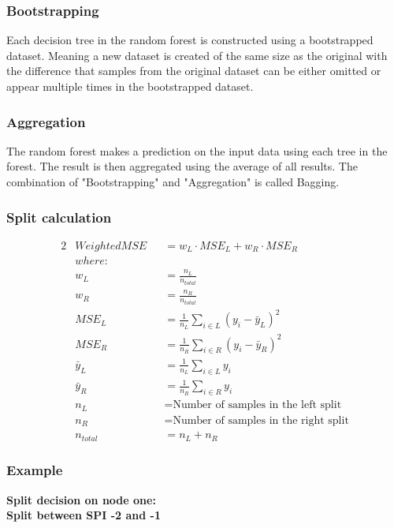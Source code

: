 \documentclass{article}
\begin{document}
\subsubsection{Bootstrapping}
Each decision tree in the random forest is constructed using a bootstrapped dataset. Meaning a new dataset is created of the same size as the original with the difference that samples from the original dataset can be either omitted or appear multiple times in the bootstrapped dataset.
\subsubsection{Aggregation}
The random forest makes a prediction on the input data using each tree in the forest. The result is then aggregated using the average of all results.
The combination of "Bootstrapping" and "Aggregation" is called Bagging.
\subsubsection{Split calculation}
\begin{alignat*}{2}
	 & Weighted MSE &  & = w_L \cdot MSE_L + w_R \cdot MSE_R                \\
	 & where:       &  &                                                    \\
	 & w_L          &  & = \frac{n_L}{n_{total}}                            \\
	 & w_R          &  & = \frac{n_R}{n_{total}}                            \\
	 & MSE_L        &  & = \frac{1}{n_L} \sum_{i \in L} (y_i - \bar{y}_L)^2 \\
	 & MSE_R        &  & = \frac{1}{n_R} \sum_{i \in R} (y_i - \bar{y}_R)^2 \\
	 & \bar{y}_L    &  & = \frac{1}{n_L} \sum_{i \in L} y_i                 \\
	 & \bar{y}_R    &  & = \frac{1}{n_R} \sum_{i \in R} y_i                 \\
	 & n_L          &  & = \text{Number of samples in the left split}       \\
	 & n_R          &  & = \text{Number of samples in the right split}      \\
	 & n_{total}    &  & = n_L + n_R
\end{alignat*}


\subsubsection{Example}
\textbf{Split decision on node one:}
\\
\textbf{Split between SPI -2 and -1}
\end{document}
